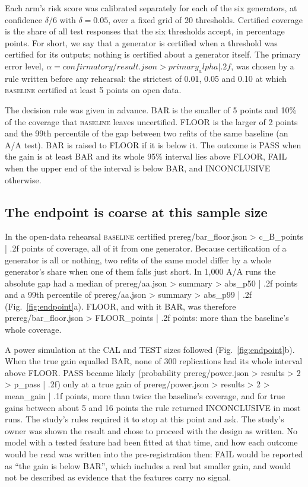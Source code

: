 \documentclass[11pt]{article}
\newcommand{\arm}[1]{\textsc{#1}}
\begin{document}
Each arm's risk score was calibrated separately for each of the six generators, at confidence $\delta/6$ with $\delta = 0.05$, over a fixed grid of 20 thresholds. Certified coverage is the share of all test responses that the six thresholds accept, in percentage points. For short, we say that a generator is certified when a threshold was certified for its outputs; nothing is certified about a generator itself. The primary error level, $\alpha = {{confirmatory/result.json > primary_alpha | .2f}}$, was chosen by a rule written before any rehearsal: the strictest of 0.01, 0.05 and 0.10 at which \arm{baseline} certified at least 5 points on open data.

The decision rule was given in advance. BAR is the smaller of 5 points and 10\% of the coverage that \arm{baseline} leaves uncertified. FLOOR is the larger of 2 points and the 99th percentile of the gap between two refits of the same baseline (an A/A test). BAR is raised to FLOOR if it is below it. The outcome is PASS when the gain is at least BAR and its whole 95\% interval lies above FLOOR, FAIL when the upper end of the interval is below BAR, and INCONCLUSIVE otherwise.

\subsection*{The endpoint is coarse at this sample size}

In the open-data rehearsal \arm{baseline} certified {{prereg/bar_floor.json > c_B_points | .2f}} points of coverage, all of it from one generator. Because certification of a generator is all or nothing, two refits of the same model differ by a whole generator's share when one of them falls just short. In 1,000 A/A runs the absolute gap had a median of {{prereg/aa.json > summary > abs_p50 | .2f}} points and a 99th percentile of {{prereg/aa.json > summary > abs_p99 | .2f}} (Fig.~\ref{fig:endpoint}a). FLOOR, and with it BAR, was therefore {{prereg/bar_floor.json > FLOOR_points | .2f}} points: more than the baseline's whole coverage.

A power simulation at the CAL and TEST sizes followed (Fig.~\ref{fig:endpoint}b). When the true gain equalled BAR, none of 300 replications had its whole interval above FLOOR. PASS became likely (probability {{prereg/power.json > results > 2 > p_pass | .2f}}) only at a true gain of {{prereg/power.json > results > 2 > mean_gain | .1f}} points, more than twice the baseline's coverage, and for true gains between about 5 and 16 points the rule returned INCONCLUSIVE in most runs. The study's rules required it to stop at this point and ask. The study's owner was shown the result and chose to proceed with the design as written. No model with a tested feature had been fitted at that time, and how each outcome would be read was written into the pre-registration then: FAIL would be reported as ``the gain is below BAR'', which includes a real but smaller gain, and would not be described as evidence that the features carry no signal.
\end{document}
